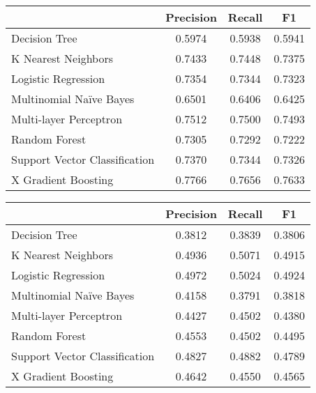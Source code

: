 \documentclass[12pt]{diazessay}
\begin{document}
\begin{table}[!htbp] \centering 
	\caption{ Evaluation metrics for ``Tier List'' \texttt{[1, 5]}}
	\label{tab:tier05}
\begin{longtable}[]{@{}lccc@{}}
	\toprule
	& Precision & Recall & F1 \\
	\midrule
	\endhead
	Decision Tree & 0.5974 & 0.5938 & 0.5941 \\
	K Nearest Neighbors & 0.7433 & 0.7448 & 0.7375 \\
	Logistic Regression & 0.7354 & 0.7344 & 0.7323 \\
	Multinomial Naïve Bayes & 0.6501 & 0.6406 & 0.6425 \\
	Multi-layer Perceptron & 0.7512 & 0.7500 & 0.7493 \\
	Random Forest & 0.7305 & 0.7292 & 0.7222 \\
	Support Vector Classification & 0.7370 & 0.7344 & 0.7326 \\
	X Gradient Boosting & 0.7766 & 0.7656 & 0.7633 \\
	\bottomrule
\end{longtable}
\end{table}


\begin{table}[!htbp] \centering 
	\caption{ Evaluation metrics ``Tier List'' \texttt{[1, 10]}}
	\label{tab:tier10}
\begin{longtable}[]{@{}lccc@{}}
	\toprule
	& Precision & Recall & F1 \\
	\midrule
	\endhead
	Decision Tree & 0.3812 & 0.3839 & 0.3806 \\
	K Nearest Neighbors & 0.4936 & 0.5071 & 0.4915 \\
	Logistic Regression & 0.4972 & 0.5024 & 0.4924 \\
	Multinomial Naïve Bayes & 0.4158 & 0.3791 & 0.3818 \\
	Multi-layer Perceptron & 0.4427 & 0.4502 & 0.4380 \\
	Random Forest & 0.4553 & 0.4502 & 0.4495 \\
	Support Vector Classification & 0.4827 & 0.4882 & 0.4789 \\
	X Gradient Boosting & 0.4642 & 0.4550 & 0.4565 \\
	\bottomrule
\end{longtable}
\end{table}
\end{document}
